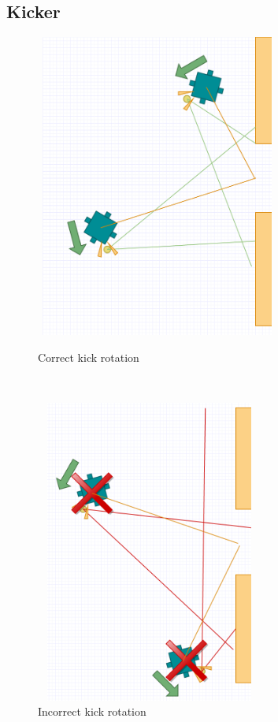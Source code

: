 \documentclass[a4paper,12pt]{article}
\begin{document}
\subsection{Kicker}

\begin{figure}[ht!]
\begin{minipage}{0.5\textwidth}
\centering
\includegraphics[width=80mm,height=100mm]{goodkick.png}
\caption{Correct kick rotation}
\label{fig:correct}
\end{minipage}
~
\begin{minipage}{0.5\textwidth}
\centering
\includegraphics[width=75mm,height=100mm]{badkick.png}
\caption{Incorrect kick rotation}
\label{fig:incorrect}
\end{minipage}
\end{figure}
\end{document}
